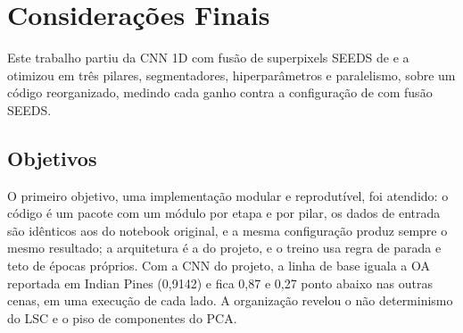 \chapter{Considerações Finais}
\label{cap:consid}

Este trabalho partiu da CNN 1D com fusão de superpixels SEEDS de  e a otimizou em três pilares, segmentadores, hiperparâmetros e paralelismo, sobre um código reorganizado, medindo cada ganho contra a configuração de  com fusão SEEDS.

\section{Objetivos}

O primeiro objetivo, uma implementação modular e reprodutível, foi atendido: o código é um pacote com um módulo por etapa e por pilar, os dados de entrada são idênticos aos do notebook original, e a mesma configuração produz sempre o mesmo resultado; a arquitetura é a do projeto, e o treino usa regra de parada e teto de épocas próprios. Com a CNN do projeto, a linha de base iguala a OA reportada em Indian Pines (0,9142) e fica 0,87 e 0,27 ponto abaixo nas outras cenas, em uma execução de cada lado. A organização revelou o não determinismo do LSC e o piso de componentes do PCA.

